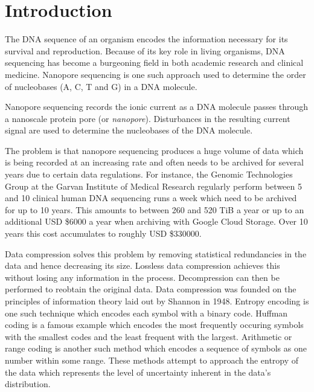 \chapter{Introduction}


The DNA sequence of an organism encodes the information necessary for its
survival and reproduction.
Because of its key role in living organisms, DNA sequencing has become a
burgeoning field in both academic research and clinical medicine.
Nanopore sequencing is one such approach used to determine the order of
nucleobases (A, C, T and G) in a DNA molecule.

Nanopore sequencing records the ionic current as a DNA molecule passes through a
nanoscale protein pore (or \textit{nanopore}). Disturbances in the resulting
current signal are used to determine the nucleobases of the DNA molecule.

The problem is that nanopore sequencing produces a huge volume of data which is
being recorded at an increasing rate and often needs to be archived for several
years due to certain data regulations.
For instance, the Genomic Technologies Group at the Garvan Institute of Medical
Research regularly perform between 5 and 10 clinical human DNA sequencing runs a
week which need to be archived for up to 10 years. This amounts to between 260
and 520 TiB a year or up to an additional USD \$6000 a year when archiving with
Google Cloud Storage. Over 10 years this cost accumulates to roughly USD
\$\num{330000}.

Data compression solves this problem by removing statistical redundancies in the
data and hence decreasing its size.
Lossless data compression achieves
this without losing any information in the process. Decompression can then be
performed to reobtain the original data. Data compression was founded on the
principles of information theory laid out by Shannon in 1948. Entropy encoding
is one such technique which encodes each symbol with a binary code. Huffman
coding is a famous example which encodes the most frequently occuring symbols with the
smallest codes and the least frequent with the largest. Arithmetic or range
coding is another such method which encodes a sequence of symbols as one number
within some range. These methods attempt to approach the entropy of the data
which represents the level of uncertainty inherent in the data's distribution.

